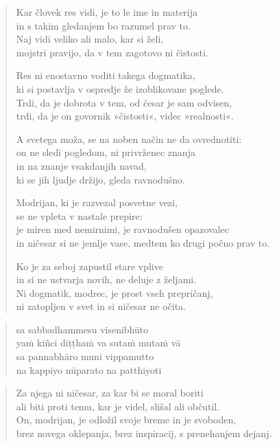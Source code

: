 \clearpage
\begin{verse}

Kar človek res vidi, je to le ime in materija\\
in s takim gledanjem bo razumel prav to.\\
Naj vidi veliko ali malo, kar si želi,\\
mojstri pravijo, da v tem zagotovo ni čistosti.

Res ni enostavno voditi takega dogmatika,\\
ki si postavlja v ospredje že izoblikovane poglede.\\
Trdi, da je dobrota v tem, od česar je sam odvisen,\\
trdi, da je on govornik »čistosti«, videc »realnosti«.

A svetega moža, se na noben način ne da ovrednotiti:\\
on ne sledi pogledom, ni privrženec znanja\\
in na znanje vsakdanjih navad,\\
ki se jih ljudje držijo, gleda ravnodušno.

Modrijan, ki je razvezal posvetne vezi,\\
se ne vpleta v nastale prepire:\\
je miren med nemirnimi, je ravnodušen opazovalec\\
in ničesar si ne jemlje vase, medtem ko drugi počno prav to.

Ko je za seboj zapustil stare vplive\\
in si ne ustvarja novih, ne deluje z željami.\\
Ni dogmatik, modrec, je prost vseh prepričanj,\\
ni zatopljen v svet in si ničesar ne očita.

\end{verse}


\clearpage
\begin{verse}

sa sabbadhammesu visenibhūto\\
yaṁ kiñci diṭṭhaṁ va sutaṁ mutaṁ vā\\
sa pannabhāro muni vippamutto\\
na kappiyo nūparato na patthiyoti

\end{verse}


\clearpage
\begin{verse}

Za njega ni ničesar, za kar bi se moral boriti\\
ali biti proti temu, kar je videl, slišal ali občutil.\\
On, modrijan, je odložil svoje breme in je svoboden,\\
brez novega oklepanja, brez inspiracij, s prenehanjem dejanj.

\end{verse}

